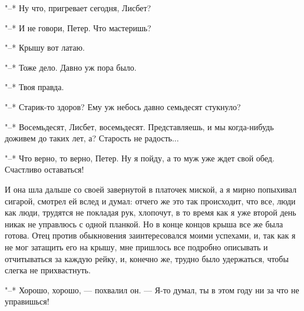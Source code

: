 "--* Ну что, пригревает сегодня, Лисбет?

"--* И не говори, Петер. Что мастеришь?

"--* Крышу вот латаю.

"--* Тоже дело. Давно уж пора было.

"--* Твоя правда.

"--* Старик-то здоров? Ему уж небось давно семьдесят стукнуло?

"--*   Восемьдесят,   Лисбет,   восемьдесят.   Представляешь,   и   мы
когда-нибудь доживем до таких лет, а? Старость не радость...

"--* Что верно,  то верно, Петер. Ну  я пойду, а то муж  уже ждет свой
обед. Счастливо оставаться!

И она  шла дальше  со своей  завернутой в платочек  миской, а  я мирно
попыхивал  сигарой,  смотрел ей  вслед  и  думал:  отчего же  это  так
происходит,  что  все,  люди  как  люди,  трудятся  не  покладая  рук,
хлопочут,  в то  время как  я  уже второй  день никак  не управлюсь  с
одной  планкой. Но  в  конце концов  крыша все  же  была готова.  Отец
против обыкновения  заинтересовался моими  успехами, и,  так как  я не
мог  затащить его  на крышу,  мне  пришлось все  подробно описывать  и
отчитываться за каждую  рейку, и, конечно же,  трудно было удержаться,
чтобы слегка не прихвастнуть.

"--* Хорошо, хорошо,  --- похвалил он. --- Я-то думал,  ты в этом году
ни за что не управишься!

